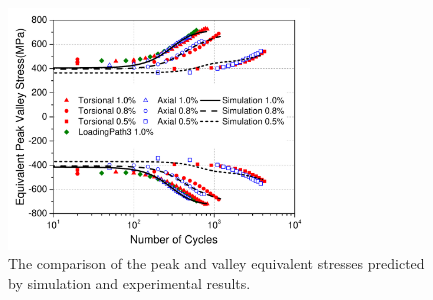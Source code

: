 \documentclass[final,5p,times,onecolumn,10pt,sort&compress]{elsarticle}
\begin{document}
\begin{figure}[htbp]
  \begin{center}
  \includegraphics[width=8cm]{PeakValleyStress.pdf}
  \caption{The comparison of the peak and valley equivalent stresses predicted by simulation and experimental results.}
  \label{fig:Comparison of PeakValleyStress}
  \end{center}
\end{figure}
\end{document}
